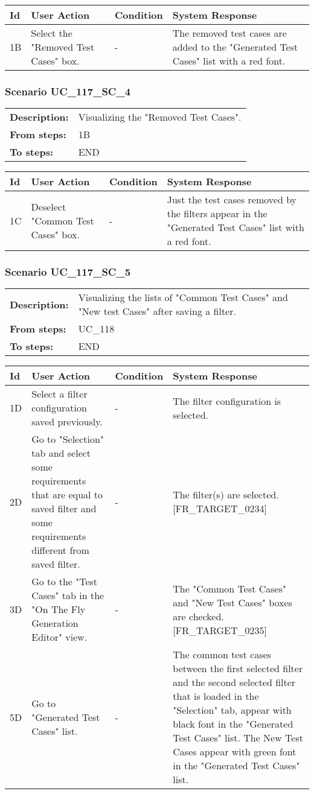 \documentclass[a4paper,11pt]{article}
\newcommand{\bl}{\\ \hline}
\begin{document}
\begin{tabular}{|p{0.8in}|p{1.6in}|p{1.6in}|p{1.6in}|}
\hline
Id & User Action & Condition & System Response  \bl 
1B & Select the "Removed Test Cases" box. & - & The removed test cases are added to the "Generated Test Cases" list with a red font. \bl 
\end{tabular}
\subsubsection*{Scenario UC_117_SC_4}
\begin{tabular}{p{1in}p{4in}}
{\bf Description:} & Visualizing the "Removed Test Cases". \\
{\bf From steps:} & 1B \\
{\bf To steps:} & END \\
\end{tabular}
 
\begin{tabular}{|p{0.8in}|p{1.6in}|p{1.6in}|p{1.6in}|}
\hline
Id & User Action & Condition & System Response  \bl 
1C & Deselect "Common Test Cases" box. & - & Just the test cases removed by the filters appear in the "Generated Test Cases" list with a red font. \bl 
\end{tabular}
\subsubsection*{Scenario UC_117_SC_5}
\begin{tabular}{p{1in}p{4in}}
{\bf Description:} & Visualizing the lists of "Common Test Cases" and "New test Cases" after saving a filter. \\
{\bf From steps:} & UC_118#1M \\
{\bf To steps:} & END \\
\end{tabular}
 
\begin{tabular}{|p{0.8in}|p{1.6in}|p{1.6in}|p{1.6in}|}
\hline
Id & User Action & Condition & System Response  \bl 
1D & Select a filter configuration saved previously. & - & The filter configuration is selected. \bl 
2D & Go to "Selection" tab and select some requirements that are equal to saved filter and some requirements different from saved filter. & - & The filter(s) are selected. [FR_TARGET_0234] \bl 
3D & Go to the "Test Cases" tab in the "On The Fly Generation Editor" view. & - & The "Common Test Cases" and "New Test Cases" boxes are checked. [FR_TARGET_0235] \bl 
5D & Go to "Generated Test Cases" list. & - & The common test cases between the first selected filter and the second selected filter that is loaded in the "Selection" tab, appear with black font in the "Generated Test Cases" list. The New Test Cases appear with green font in the "Generated Test Cases" list. \bl 
\end{tabular}
\end{document}
